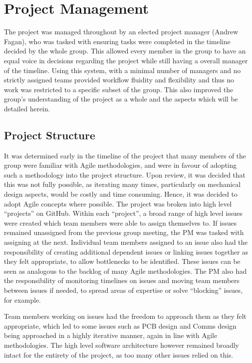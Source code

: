 \chapter{Project Management}\label{pm}

The project was managed throughout by an elected project manager 
(Andrew Fagan), who was tasked with ensuring tasks were 
completed in the timeline decided by the whole group. This 
allowed every member in the group to have an equal voice in 
decisions regarding the project while still having a overall 
manager of the timeline. Using this system, with a minimal 
number of managers and no strictly assigned teams provided
workflow fluidity and flexibility and thus no work was restricted 
to a specific subset of the group. This also improved the 
group's understanding of the project as a whole and the aspects 
which will be detailed herein. 

\section{Project Structure}\label{pm/structure}

It was determined early in the timeline of the project that many members of the 
group were familiar with Agile methodologies, and were in favour of 
adopting such a methodology into the project structure. Upon review, it was 
decided that this was not fully possible, as iterating many times, particularly on 
mechanical design aspects, would be costly and time consuming. Hence, it was 
decided to adopt Agile concepts where possible. The project was broken into high 
level ``projects'' on GitHub. Within each ``project'', a broad range of high level 
issues were created which team members were able to assign themselves to. If 
issues remained unassigned from the previous group meeting, the PM was tasked with 
assigning at the next. Individual team members assigned to an issue also had the 
responsibility of creating additional dependent issues or linking issues together 
as they felt appropriate, to allow bottlenecks to be identified. These issues can 
be seen as analogous to the backlog of many Agile methodologies. The PM also had 
the responsibility of monitoring timelines on issues and moving team members 
between issues if needed, to spread areas of expertise or solve ``blocking'' 
issues, for example.

Team members working on issues had the freedom to approach them as they felt 
appropriate, which led to some issues such as PCB design and Comms design being 
approached in a highly iterative manner, again in line with Agile methodologies. 
The high level software architecture however remained broadly intact for the 
entirety of the project, as too many other issues relied on this.

